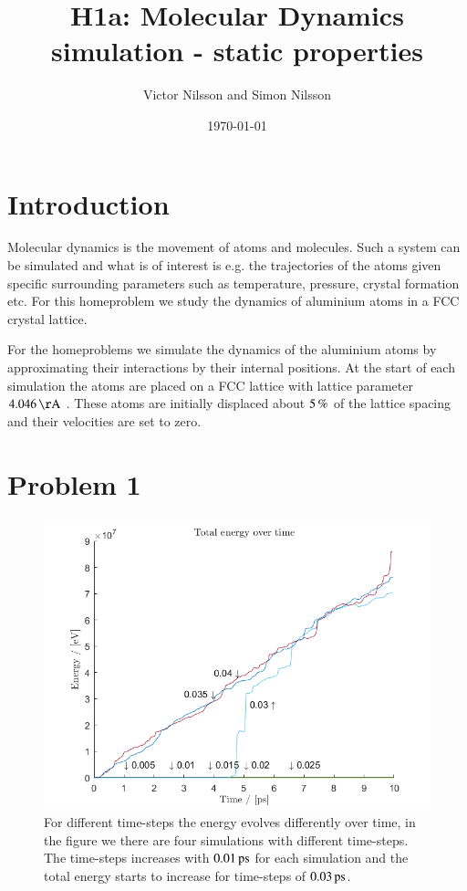 



\title{H1a: Molecular Dynamics simulation - static properties}
\author{Victor Nilsson and Simon Nilsson}
\date{\today}





\section*{Introduction}

Molecular dynamics is the movement of atoms and molecules. Such a system can be simulated and what is of interest is e.g. the trajectories of the atoms given specific surrounding parameters such as temperature, pressure, crystal formation etc. For this homeproblem we study the dynamics of aluminium atoms in a FCC crystal lattice.

For the homeproblems we simulate the dynamics of the aluminium atoms by approximating their interactions by their internal positions. At the start of each simulation the atoms are placed on a FCC lattice with lattice parameter $\unit[4.046]{\AA}$ \cite{al_wiki}. These atoms are initially displaced about $\unit[5]{\%}$ of the lattice spacing and their velocities are set to zero.

\section*{Problem 1}

\begin{figure}[H]
    \centering
    \includegraphics[width=\textwidth]{graphics/task1/energy.png}
    \caption{For different time-steps the energy evolves differently over time, in the figure we there are four simulations with different time-steps. The time-steps increases with $\unit[0.01]{ps}$ for each simulation and the total energy starts to increase for time-steps of $\unit[0.03]{ps}$.}
    \label{fig:timestep}
\end{figure}

